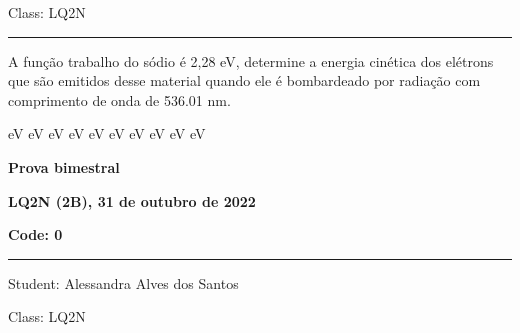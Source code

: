 \documentclass[12pt, addpoints]{exam}
\begin{document}
        \begin{minipage}{0.20\linewidth}
            \begin{flushright}
                Class: LQ2N
            \end{flushright}
        \end{minipage}
        \vspace{0.5cm} \hrule \vspace{0.5cm}
        \begin{questions}
\begin{multicols*}{2}
\question A função trabalho do sódio é 2,28 eV, determine a energia cinética dos elétrons que são emitidos desse material quando ele é bombardeado por radiação com comprimento de onda de  536.01 nm.

\begin{oneparchoices}
 eV eV eV eV eV eV eV eV eV eV
\end{oneparchoices}\end{multicols*}
\end{questions}
\newpage
        \begin{minipage}[b]{0.75\linewidth}
            \begin{flushleft}
                {\bf \large Prova bimestral}
            \end{flushleft}
            \begin{flushleft}
                {\bf \large LQ2N (2B), 31 de outubro de 2022}
            \end{flushleft}
        \end{minipage}
        \begin{minipage}[b]{0.20\linewidth}
            \begin{flushright}
                {\bf \large Code: 0}
            \end{flushright}
        \end{minipage}
        \vspace{0.5cm} \hrule \vspace{0.5cm}
        \begin{minipage}{0.75\linewidth}
            \begin{flushleft}
                Student: Alessandra Alves dos Santos
            \end{flushleft}
        \end{minipage}
        \begin{minipage}{0.20\linewidth}
            \begin{flushright}
                Class: LQ2N
            \end{flushright}
        \end{minipage}
\end{document}
